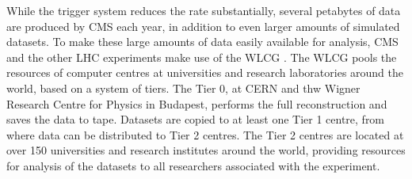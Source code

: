While the trigger system reduces the rate substantially, several
petabytes of data are produced by \ac{CMS} each year, in addition to 
even larger amounts of simulated datasets. To 
make these large amounts of data easily available for analysis, 
\ac{CMS} and the other \ac{LHC} experiments make use of the \ac{WLCG} \cite{lhc-wlcg}. 
The \ac{WLCG} pools the resources of computer centres at universities and research
laboratories around the world, based on a system of tiers. The Tier 0, at \ac{CERN} and
thw Wigner Research Centre for Physics in Budapest, performs the full reconstruction
and saves the data to tape. Datasets are copied to at least one Tier 1 centre, from
where data can be distributed to Tier 2 centres. The Tier 2 centres are located
at over 150 universities and research institutes around the world, providing 
resources for analysis of the datasets to all researchers associated with the experiment.



